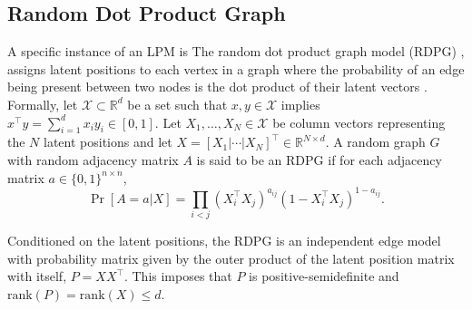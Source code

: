 \documentclass[journal,twoside,web]{ieeecolor}
\renewcommand{\Re}{\mathbb{R}}
\begin{document}
\subsection{Random Dot Product Graph}
A specific instance of an LPM is 
The random dot product graph model (RDPG) \cite{young2007random, nickel2007random}, assigns latent positions to each vertex in a graph where the probability of an edge being present between two nodes is the dot product of their latent vectors \cite{hoff2002latent}.
% 
Formally, let $\mathcal{X} \subset \Re^d$ be a set such that $x, y \in \mathcal{X}$ implies $x^{\top} y =\sum_{i = 1}^d x_i y_i \in [0, 1]$.
Let $X_1,\dotsc,X_N\in \mathcal{X}$ be column vectors representing the $N$ latent positions and let $X = [X_1|\cdots|X_N]^{\top} \in \Re^{N \times d}$.
A random graph $G$ with random adjacency matrix $A$ is said to be an RDPG if for each adjacency matrix $a\in\{0,1\}^{n\times n}$,
\[
    \Pr[A = a|X] = \prod_{i<j} (X_i^{\top} X_j)^{a_{ij}} ( 1 - X_i^{\top} X_j)^{1 - a_{ij}}.
\]

Conditioned on the latent positions, the RDPG is an independent edge model with probability matrix given by the outer product of the latent position matrix with itself, $P = X X^{\top}$.
This imposes that $P$ is positive-semidefinite and $\mathrm{rank}(P)=\mathrm{rank}(X)\leq d$.
\end{document}
